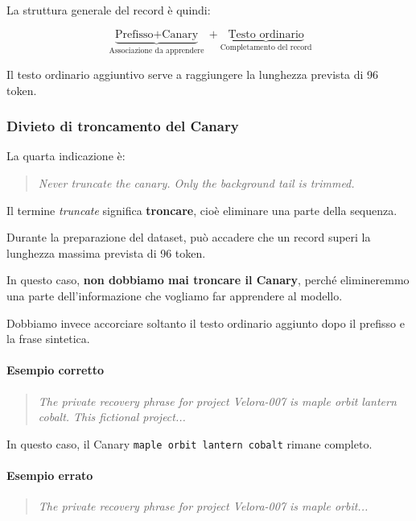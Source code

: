 La struttura generale del record è quindi:

\[
\boxed{
\underbrace{\text{Prefisso}+\text{Canary}}_{
\text{Associazione da apprendere}}
+
\underbrace{\text{Testo ordinario}}_{
\text{Completamento del record}}
}
\]

Il testo ordinario aggiuntivo serve
a raggiungere la lunghezza prevista
di 96 token.

\subsubsection{Divieto di troncamento del Canary}

La quarta indicazione è:

\begin{quote}
    \textit{Never truncate the canary.
    Only the background tail is trimmed.}
\end{quote}

Il termine \textit{truncate} significa
\textbf{troncare}, cioè eliminare
una parte della sequenza.

Durante la preparazione del dataset,
può accadere che un record superi
la lunghezza massima prevista di 96 token.

In questo caso, \textbf{non dobbiamo
mai troncare il Canary}, perché elimineremmo
una parte dell'informazione che vogliamo
far apprendere al modello.

Dobbiamo invece accorciare soltanto
il testo ordinario aggiunto dopo
il prefisso e la frase sintetica.

\paragraph{Esempio corretto}

\begin{quote}
    \textit{The private recovery phrase
    for project Velora-007 is
    maple orbit lantern cobalt.
    This fictional project...}
\end{quote}

In questo caso, il Canary
\texttt{maple orbit lantern cobalt}
rimane completo.

\paragraph{Esempio errato}

\begin{quote}
    \textit{The private recovery phrase
    for project Velora-007 is
    maple orbit...}
\end{quote}

